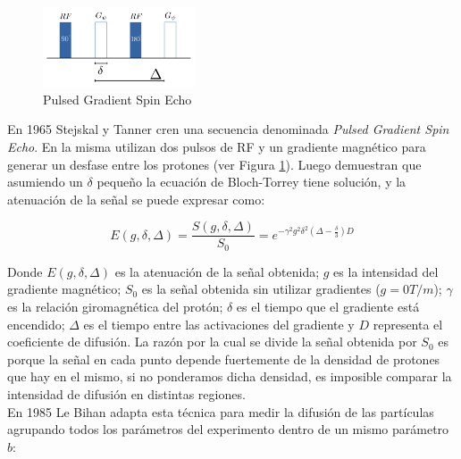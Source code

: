 \begin{figure}
    \begin{center}
        \vspace{-1cm}
        \includegraphics[width=0.4\textwidth]{img/fgp.png}
        \caption{Pulsed Gradient Spin Echo}
        \label{fig:fgp}
    \end{center}
\end{figure}  

En 1965 Stejskal y Tanner \cite{Stejskal1965} cren una secuencia denominada 
\textit{Pulsed Gradient Spin Echo}. En la misma utilizan dos pulsos de RF y 
un gradiente magn\'etico para generar un desfase entre los protones (ver Figura
\ref{fig:fgp}). Luego demuestran que asumiendo un $\delta$ peque\~no la ecuaci\'on
de Bloch-Torrey tiene soluci\'on, y la atenuaci\'on de la se\~nal se puede expresar
como:

\vspace{0.3cm}

\begin{equation}
    E(g, \delta, \Delta) = 
    \frac{S(g, \delta, \Delta)}{S_0} =
         e^{-\gamma^2 g^2 \delta^2 \left(\Delta - \frac{\delta}{3}\right) D} 
    \label{eq:st}
\end{equation}

\vspace{0.1cm}
  
Donde $E(g, \delta, \Delta)$ es la atenuaci\'on de la se\~nal obtenida; 
$g$ es la intensidad del gradiente magn\'etico; $S_0$ es la se\~nal obtenida sin
utilizar gradientes ($g=0 T/m$); $\gamma$ es la relaci\'on giromagn\'etica del 
prot\'on; $\delta$ es el tiempo que el gradiente est\'a encendido; $\Delta$ es el
tiempo entre las activaciones del gradiente y $D$ representa el coeficiente de
difusi\'on. La raz\'on por la cual se divide la se\~nal obtenida por $S_0$ es
porque la se\~nal en cada punto depende fuertemente de la densidad de protones
que hay en el mismo, si no ponderamos dicha densidad, es imposible comparar la
intensidad de difusi\'on en distintas regiones. \\

En 1985 Le Bihan \cite{LEBIHAN} adapta esta t\'ecnica para medir la difusi\'on 
de las part\'iculas agrupando todos los par\'ametros del experimento dentro de 
un mismo par\'ametro $b$:

